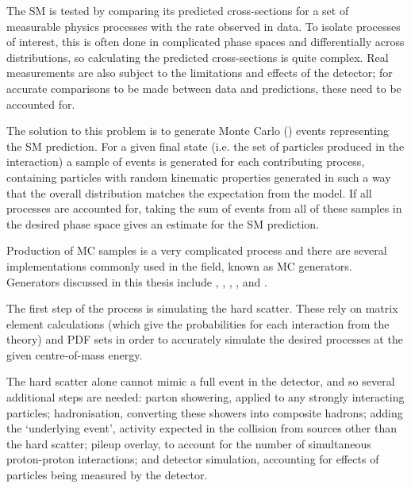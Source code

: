 
The \ac{SM} is tested by comparing its predicted cross-sections for a set of
measurable physics processes with the rate observed in data. To isolate
processes of interest, this is often done in complicated phase spaces and
differentially across distributions, so calculating the predicted cross-sections
is quite complex. Real measurements are also subject to the limitations and
effects of the detector; for accurate comparisons to be made between data and
predictions, these need to be accounted for.

The solution to this problem is to generate Monte Carlo () events
representing the \ac{SM} prediction. For a given final state (i.e. the set of
particles produced in the interaction) a sample of events is generated for each
contributing process, containing particles with random kinematic properties
generated in such a way that the overall distribution matches the expectation
from the model. If all processes are accounted for, taking the sum of events
from all of these samples in the desired phase space gives an estimate for the
\ac{SM} prediction.

Production of \ac{MC} samples is a very complicated process and there are
several implementations commonly used in the field, known as
\ac{MC} generators. Generators discussed in this thesis include \madgraph
\cite{madgraph5amc}, \sherpa \cite{sherpa2dot2}, \pythia \cite{pythia8dot2},
\powheg \cite{powheg}, and \herwig \cite{herwigpp}.

The first step of the process is simulating the hard scatter. These rely on
matrix element calculations (which give the probabilities for each interaction
from the theory) and \ac{PDF} sets in order to accurately simulate the desired
processes at the given centre-of-mass energy.

The hard scatter alone cannot mimic a full event in the detector, and so several
additional steps are needed: parton showering, applied to any strongly
interacting particles; hadronisation, converting these showers into composite
hadrons; adding the `underlying event', activity expected in the collision from
sources other than the hard scatter; pileup overlay, to account for the number
of simultaneous proton-proton interactions; and detector simulation, accounting
for effects of particles being measured by the detector.

